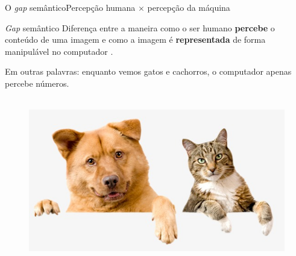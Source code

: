 \documentclass{beamer}
\begin{document}
    \begin{frame}{O \emph{gap} semântico}{Percepção humana $\times$ percepção da máquina}

        \begin{block}{\emph{Gap} semântico}
            Diferença entre a maneira como o ser humano \textbf{percebe} o conteúdo de uma imagem
            e como a imagem é \textbf{representada} de forma manipulável no computador \cite{adrian2017}.
        \end{block}

        \vspace{.2cm}

        \pause

        Em outras palavras: enquanto vemos gatos e cachorros, o computador apenas
        percebe números.\\~\\

        \begin{figure}
            \centering
            \includegraphics[scale=0.3]{img/gatocachorro.jpg}
        \end{figure}

        \pause


    \end{frame}
\end{document}
